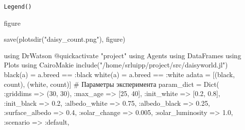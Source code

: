 \documentclass[
  english,
  russian,
  12pt,
  a4paper,
  DIV=11,
  numbers=noendperiod]{scrreprt}
\newenvironment{Shaded}{\begin{snugshade}}{\end{snugshade}}
\newcommand{\BuiltInTok}[1]{\textcolor[rgb]{0.00,0.23,0.31}{#1}}
\newcommand{\CommentTok}[1]{\textcolor[rgb]{0.37,0.37,0.37}{#1}}
\newcommand{\FloatTok}[1]{\textcolor[rgb]{0.68,0.00,0.00}{#1}}
\newcommand{\FunctionTok}[1]{\textcolor[rgb]{0.28,0.35,0.67}{#1}}
\newcommand{\ImportTok}[1]{\textcolor[rgb]{0.00,0.46,0.62}{#1}}
\newcommand{\NormalTok}[1]{\textcolor[rgb]{0.00,0.23,0.31}{#1}}
\newcommand{\OperatorTok}[1]{\textcolor[rgb]{0.37,0.37,0.37}{#1}}
\newcommand{\PreprocessorTok}[1]{\textcolor[rgb]{0.68,0.00,0.00}{#1}}
\newcommand{\StringTok}[1]{\textcolor[rgb]{0.13,0.47,0.30}{#1}}
\begin{document}
\begin{verbatim}
Legend()
\end{verbatim}

figure

\begin{Shaded}
\begin{Highlighting}[]
\FunctionTok{save}\NormalTok{(}\FunctionTok{plotsdir}\NormalTok{(}\StringTok{"daisy\_count.png"}\NormalTok{), figure)}
\end{Highlighting}
\end{Shaded}

\begin{Shaded}
\begin{Highlighting}[]
\ImportTok{using} \BuiltInTok{DrWatson}
\PreprocessorTok{@quickactivate} \StringTok{"project"}
\ImportTok{using} \BuiltInTok{Agents}
\ImportTok{using} \BuiltInTok{DataFrames}
\ImportTok{using} \BuiltInTok{Plots}
\ImportTok{using} \BuiltInTok{CairoMakie}
\FunctionTok{include}\NormalTok{(}\StringTok{"/home/srluipp/project/src/daisyworld.jl"}\NormalTok{)}
\FunctionTok{black}\NormalTok{(a) }\OperatorTok{=}\NormalTok{ a.breed }\OperatorTok{==} \OperatorTok{:}\NormalTok{black}
\FunctionTok{white}\NormalTok{(a) }\OperatorTok{=}\NormalTok{ a.breed }\OperatorTok{==} \OperatorTok{:}\NormalTok{white}
\NormalTok{adata }\OperatorTok{=}\NormalTok{ [(black, count), (white, count)]}
\CommentTok{\# Параметры эксперимента}
\NormalTok{param\_dict }\OperatorTok{=} \FunctionTok{Dict}\NormalTok{(}
\OperatorTok{:}\NormalTok{griddims }\OperatorTok{=\textgreater{}}\NormalTok{ (}\FloatTok{30}\NormalTok{, }\FloatTok{30}\NormalTok{),}
\OperatorTok{:}\NormalTok{max\_age }\OperatorTok{=\textgreater{}}\NormalTok{ [}\FloatTok{25}\NormalTok{, }\FloatTok{40}\NormalTok{],}
\OperatorTok{:}\NormalTok{init\_white }\OperatorTok{=\textgreater{}}\NormalTok{ [}\FloatTok{0.2}\NormalTok{, }\FloatTok{0.8}\NormalTok{],}
\OperatorTok{:}\NormalTok{init\_black }\OperatorTok{=\textgreater{}} \FloatTok{0.2}\NormalTok{,}
\OperatorTok{:}\NormalTok{albedo\_white }\OperatorTok{=\textgreater{}} \FloatTok{0.75}\NormalTok{,}
\OperatorTok{:}\NormalTok{albedo\_black }\OperatorTok{=\textgreater{}} \FloatTok{0.25}\NormalTok{,}
\OperatorTok{:}\NormalTok{surface\_albedo }\OperatorTok{=\textgreater{}} \FloatTok{0.4}\NormalTok{,}
\OperatorTok{:}\NormalTok{solar\_change }\OperatorTok{=\textgreater{}} \FloatTok{0.005}\NormalTok{,}
\OperatorTok{:}\NormalTok{solar\_luminosity }\OperatorTok{=\textgreater{}} \FloatTok{1.0}\NormalTok{,}
\OperatorTok{:}\NormalTok{scenario }\OperatorTok{=\textgreater{}} \OperatorTok{:}\NormalTok{default,}

\end{Highlighting}
\end{Shaded}
\end{document}
